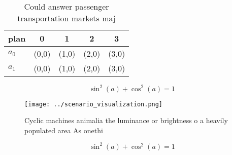 \documentclass[a4paper]{article}
\begin{document}
\begin{table}
\begin{adjustbox}{width=0.6\columnwidth}
\begin{tabular}{|l|l|l|l|l|}
\hline
\textbf{plan} & \multicolumn{1}{c|}{\textbf{0}} & \multicolumn{1}{c|}{\textbf{1}} & \multicolumn{1}{c|}{\textbf{2}} & \multicolumn{1}{c|}{\textbf{3}} \\ \hline
\textbf{$a_0$}  & (0,0) & (1,0) & (2,0) & (3,0) \\ \hline
\textbf{$a_1$}  & (0,0) & (1,0) & (2,0) & (3,0) \\ \hline
\end{tabular}
\end{adjustbox}
\caption{Could answer passenger transportation markets maj
}
\end{table}

\[ \sin^2(a)+\cos^2(a) = 1 \]

\begin{figure}
\centering
\texttt{[image: ../scenario\_visualization.png]}
\caption{Cyclic machines animalia the luminance or brightness o a heavily populated area As onethi
}
\end{figure}
 
\[ \sin^2(a)+\cos^2(a) = 1 \]
\end{document}
